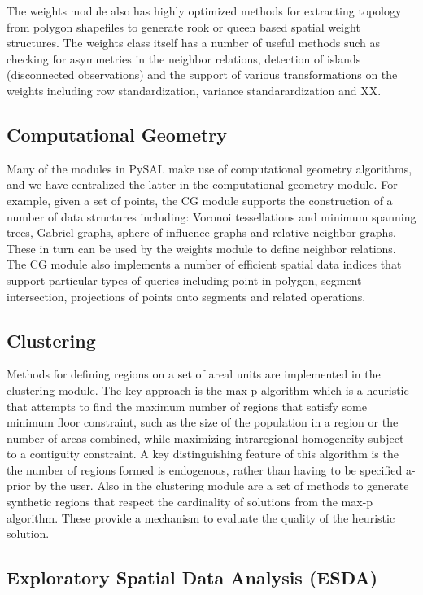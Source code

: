 \documentclass[11pt, titlepage]{article}
\begin{document}
The weights module also has highly optimized methods for extracting
topology from polygon shapefiles to generate rook or queen based spatial
weight structures. The weights class itself has a number of useful
methods such as checking for asymmetries in the neighbor relations,
detection of islands (disconnected observations) and the support of
various transformations on the weights including row standardization,
variance standarardization and XX.

\subsection{Computational Geometry}

Many of the modules in PySAL make use of computational geometry
algorithms, and we have centralized the latter in the computational
geometry module. For example, given a set of points, the CG module
supports the construction of a number of data structures including:
Voronoi tessellations and minimum spanning trees, Gabriel graphs, sphere
of influence graphs and relative neighbor graphs. These in turn can be
used by the weights module to define neighbor relations. The CG module
also implements a number of efficient spatial data indices that support
particular types of queries including point in polygon, segment
intersection, projections of points onto segments and related
operations.

\subsection{Clustering}

Methods for defining regions on a set of areal units are implemented in
the clustering module. The key approach is the max-p algorithm which is
a heuristic that attempts to find the maximum number of regions that
satisfy some minimum floor constraint, such as the size of the
population in a region or the number of areas combined, while maximizing
intraregional homogeneity subject to a contiguity constraint. A key
distinguishing feature of this algorithm is the the number of regions
formed is endogenous, rather than having to be specified a-prior by the
user. Also in the clustering module are a set of methods to generate
synthetic regions that respect the cardinality of solutions from the
max-p algorithm. These provide a mechanism to evaluate the quality of
the heuristic solution.

\subsection{Exploratory Spatial Data Analysis (ESDA)}
\end{document}
